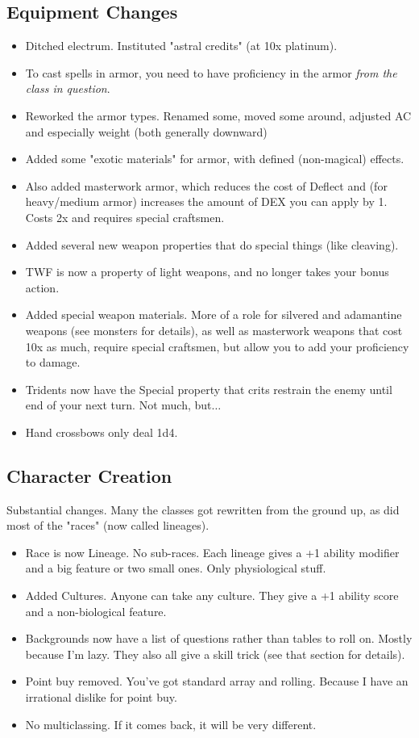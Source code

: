 \subsection*{Equipment Changes}
\begin{itemize}
    \item Ditched electrum. Instituted "astral credits" (at 10x platinum).
    \item To cast spells in armor, you need to have proficiency in the armor \textit{from the class in question}.
    \item Reworked the armor types. Renamed some, moved some around, adjusted AC and especially weight (both generally downward)
    \item Added some "exotic materials" for armor, with defined (non-magical) effects.
    \item Also added masterwork armor, which reduces the cost of Deflect and (for heavy/medium armor) increases the amount of DEX you can apply by 1. Costs 2x and requires special craftsmen.
    \item Added several new weapon properties that do special things (like cleaving).
    \item TWF is now a property of light weapons, and no longer takes your bonus action.
    \item Added special weapon materials. More of a role for silvered and adamantine weapons (see monsters for details), as well as masterwork weapons that cost 10x as much, require special craftsmen, but allow you to add your proficiency to damage.
    \item Tridents now have the Special property that crits restrain the enemy until end of your next turn. Not much, but$\dots$
    \item Hand crossbows only deal 1d4.
\end{itemize}
\subsection*{Character Creation}
Substantial changes. Many the classes got rewritten from the ground up, as did most of the "races" (now called lineages). 
\begin{itemize}
    \item Race is now Lineage. No sub-races. Each lineage gives a +1 ability modifier and a big feature or two small ones. Only physiological stuff.
    \item Added Cultures. Anyone can take any culture. They give a +1 ability score and a non-biological feature.
    \item Backgrounds now have a list of questions rather than tables to roll on. Mostly because I'm lazy. They also all give a skill trick (see that section for details).
    \item Point buy removed. You've got standard array and rolling. Because I have an irrational dislike for point buy.
    \item No multiclassing. If it comes back, it will be very different.
\end{itemize}
